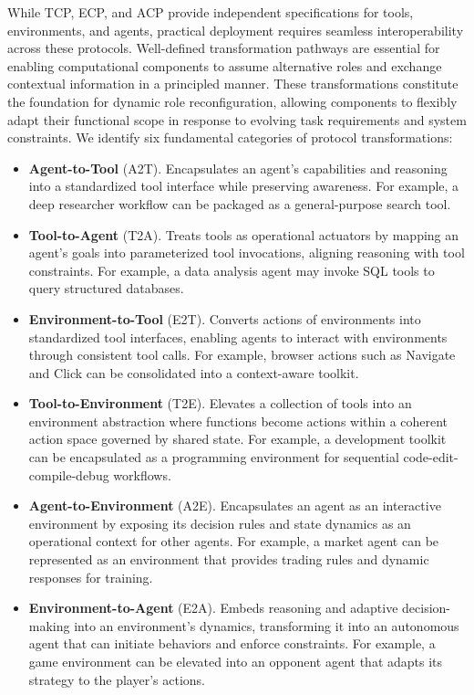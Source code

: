 \documentclass[11pt]{article}
\begin{document}
While TCP, ECP, and ACP provide independent specifications for tools, environments, and agents, practical deployment requires seamless interoperability across these protocols. Well-defined transformation pathways are essential for enabling computational components to assume alternative roles and exchange contextual information in a principled manner. These transformations constitute the foundation for dynamic role reconfiguration, allowing components to flexibly adapt their functional scope in response to evolving task requirements and system constraints. We identify six fundamental categories of protocol transformations:
\begin{itemize}[leftmargin=*,itemsep=0.1em]
  \item \textbf{Agent-to-Tool} (A2T). Encapsulates an agent's capabilities and reasoning into a standardized tool interface while preserving awareness. For example, a deep researcher workflow can be packaged as a general-purpose search tool.
  
  \item \textbf{Tool-to-Agent} (T2A). Treats tools as operational actuators by mapping an agent's goals into parameterized tool invocations, aligning reasoning with tool constraints. For example, a data analysis agent may invoke SQL tools to query structured databases.
  
  \item \textbf{Environment-to-Tool} (E2T). Converts actions of environments into standardized tool interfaces, enabling agents to interact with environments through consistent tool calls. For example, browser actions such as Navigate and Click can be consolidated into a context-aware toolkit.
  
  \item \textbf{Tool-to-Environment} (T2E). Elevates a collection of tools into an environment abstraction where functions become actions within a coherent action space governed by shared state. For example, a development toolkit can be encapsulated as a programming environment for sequential code-edit-compile-debug workflows.
  
  \item \textbf{Agent-to-Environment} (A2E). Encapsulates an agent as an interactive environment by exposing its decision rules and state dynamics as an operational context for other agents. For example, a market agent can be represented as an environment that provides trading rules and dynamic responses for training.
  
  \item \textbf{Environment-to-Agent} (E2A). Embeds reasoning and adaptive decision-making into an environment's dynamics, transforming it into an autonomous agent that can initiate behaviors and enforce constraints. For example, a game environment can be elevated into an opponent agent that adapts its strategy to the player's actions.
\end{itemize}
\end{document}
